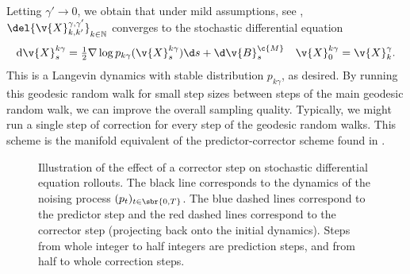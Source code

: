 Letting \(\gamma' \to 0\), we obtain that under mild assumptions, see \cite[Theorem 3.1]{kuwada2012convergence}, \(\del{\v{X}_{k, k'}^{\gamma, \gamma'}}_{k\in\N}\) converges to the stochastic differential equation \begin{equation} \mathrm{d} \v{X}_s^{k\gamma} = \tfrac{1}{2} \nabla \log p_{k\gamma}(\v{X}_s^{k\gamma}) \d s + \d \v{B}_s^\c{M} \quad \v{X}_0^{k \gamma} = \v{X}_k^\gamma.
\end{equation}
This is a Langevin dynamics with stable distribution  \(p_{k\gamma}\), as desired.
By running this geodesic random walk for small step sizes between steps of the main geodesic random walk, we can improve the overall sampling quality.
Typically, we might run a single step of correction for every step of the geodesic random walks.
This scheme is the manifold equivalent of the predictor-corrector scheme found in \textcite{song2020score}.

\begin{figure}[t!]
	\centering
	\caption{Illustration of the effect of a corrector step on stochastic differential equation rollouts.
		The black line corresponds to the dynamics of the noising process \((p_t)_{t \in \sbr{0,T}}\).
		The blue dashed lines correspond to the predictor step and the red dashed lines correspond to the corrector step (projecting back onto the initial dynamics).
		Steps from whole integer to half integers are prediction steps, and from half to whole correction steps.
	}
	\label{fig:illustration_pred_correc}
\end{figure}

